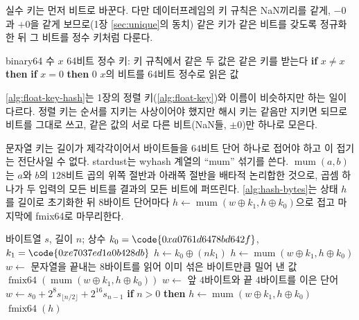 실수 키는 먼저 비트로 바꾼다. 다만 데이터프레임의 키 규칙은 NaN끼리를 같게, $-0$과 $+0$을 같게 보므로(1장 \cref{sec:unique}의 동치) 같은 키가 같은 비트를 갖도록 정규화한 뒤 그 비트를 정수 키처럼 다룬다.

\begin{algorithm}[htbp]
\begin{algorithmic}[1]
\Require binary64 수 $x$
\Ensure 64비트 정수 키: 키 규칙에서 같은 두 값은 같은 키를 받는다
\State \textbf{if} $x\neq x$ \textbf{then} \Return {} 
\State \textbf{if} $x=0$ \textbf{then} \Return $0$ 
\State \Return $x$의 비트를 64비트 정수로 읽은 값
\end{algorithmic}
\caption{실수 키의 정규화 (stardust )}
\label{alg:float-key-hash}
\end{algorithm}

\cref{alg:float-key-hash}는 1장의 정렬 키(\cref{alg:float-key})와 이름이 비슷하지만 하는 일이 다르다. 정렬 키는 순서를 지키는 사상이어야 했지만 해시 키는 같음만 지키면 되므로 비트를 그대로 쓰고, 같은 값의 서로 다른 비트(NaN들, $\pm0$)만 하나로 모은다.

문자열 키는 길이가 제각각이어서 바이트들을 $64$비트 단어 하나로 접어야 하고 이 접기는 전단사일 수 없다. stardust는 wyhash 계열의 ``mum'' 섞기를 쓴다\cite{wyhash}. $\operatorname{mum}(a,b)$는 $a$와 $b$의 $128$비트 곱의 위쪽 절반과 아래쪽 절반을 배타적 논리합한 것으로, 곱셈 하나가 두 입력의 모든 비트를 결과의 모든 비트에 퍼뜨린다. \cref{alg:hash-bytes}는 상태 $h$를 길이로 초기화한 뒤 $8$바이트 단어마다 $h\gets\operatorname{mum}(w\oplus k_1,h\oplus k_0)$으로 접고 마지막에 fmix64로 마무리한다.

\begin{algorithm}[htbp]
\begin{algorithmic}[1]
\Require 바이트열 $s$, 길이 $n$; 상수 $k_0=\code{0xa0761d6478bd642f}$, $k_1=\code{0xe7037ed1a0b428db}$
\State $h\gets k_0\oplus(nk_1)$ 
   $h\gets\operatorname{mum}(w\oplus k_1,h\oplus k_0)$
  \EndFor
  \State $w\gets$ 문자열을 끝내는 $8$바이트를 읽어 이미 섞은 바이트만큼 밀어 낸 값 
  \State \Return $\operatorname{fmix64}(\operatorname{mum}(w\oplus k_1,h\oplus k_0))$
\EndIf
{} $w\gets$ 앞 $4$바이트와 끝 $4$바이트를 이은 단어 
 $w\gets s_0+2^8s_{\lfloor n/2\rfloor}+2^{16}s_{n-1}$
\EndIf
\State \textbf{if} $n>0$ \textbf{then} $h\gets\operatorname{mum}(w\oplus k_1,h\oplus k_0)$
\State \Return $\operatorname{fmix64}(h)$
\end{algorithmic}
\caption{문자열 키의 해시 (stardust )}
\label{alg:hash-bytes}
\end{algorithm}

